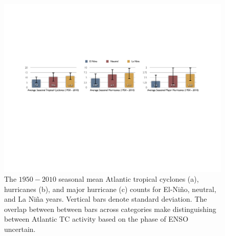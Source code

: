 \documentclass[]{article}
\begin{document}

\begin{figure}[htbp]
	\hspace*{-.5cm}
	\centering
		\includegraphics[width=5in]{figures/nino_nina_avg_diff.pdf}
	\caption{The $1950-2010$ seasonal mean Atlantic tropical cyclones (a), hurricanes (b), and major hurricane (c) counts for El-Ni\~no, neutral, and La Ni\~na years. Vertical bars denote standard deviation. The overlap between between bars across categories make distinguishing between Atlantic TC activity based on the phase of ENSO uncertain.}
	\label{fig:enso_bars}
\end{figure}


\end{document}
